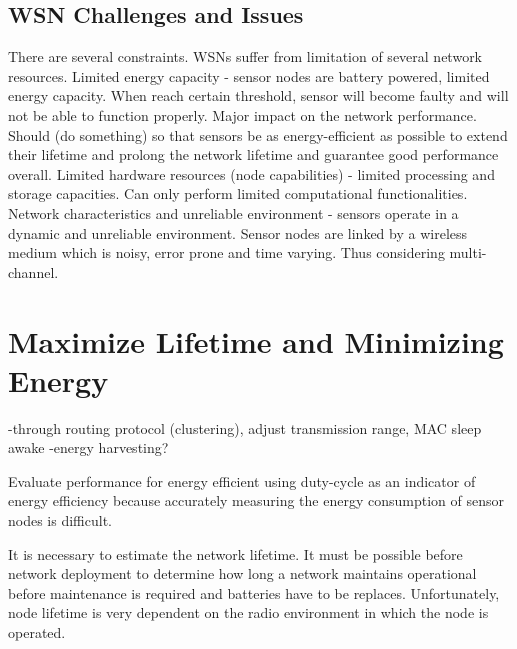 \subsection{WSN Challenges and Issues}
There are several constraints. WSNs suffer from limitation of several network resources. Limited energy capacity - sensor nodes are battery powered, limited energy capacity. When reach certain threshold, sensor will become faulty and will not be able to function properly. Major impact on the network performance. Should (do something) so that sensors be as energy-efficient as possible to extend their lifetime and prolong the network lifetime and guarantee good performance overall.
Limited hardware resources (node capabilities) - limited processing and storage capacities. Can only perform limited computational functionalities.
Network characteristics and unreliable environment - sensors operate in a dynamic and unreliable environment. Sensor nodes are linked by a wireless medium which is noisy, error prone and time varying. Thus considering multi-channel. \cite{singh2010routing}

\section{Maximize Lifetime and Minimizing Energy}
-through routing protocol (clustering), adjust transmission range, MAC sleep awake 
-energy harvesting?

Evaluate performance for energy efficient using duty-cycle as an indicator of energy efficiency because accurately measuring the energy consumption of sensor nodes is difficult. \cite{y-mac}

It is necessary to estimate the network lifetime. It must be possible before network deployment to determine how long a network maintains operational before maintenance is required and batteries have to be replaces. Unfortunately, node lifetime is very dependent on the radio environment in which the node is operated. \cite{alexlifetime}

